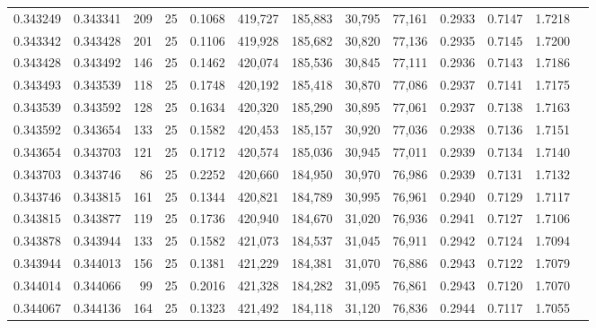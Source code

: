 \begin{tabular}{rrrrrrrrrrrrr}
0.343249 & 0.343341 &   209 &  25 &                                     0.1068 & 419,727 & 185,883 &  30,795 &  77,161 & 0.2933 & 0.7147 & 1.7218 \\
0.343342 & 0.343428 &   201 &  25 &                                     0.1106 & 419,928 & 185,682 &  30,820 &  77,136 & 0.2935 & 0.7145 & 1.7200 \\
0.343428 & 0.343492 &   146 &  25 &                                     0.1462 & 420,074 & 185,536 &  30,845 &  77,111 & 0.2936 & 0.7143 & 1.7186 \\
0.343493 & 0.343539 &   118 &  25 &                                     0.1748 & 420,192 & 185,418 &  30,870 &  77,086 & 0.2937 & 0.7141 & 1.7175 \\
0.343539 & 0.343592 &   128 &  25 &                                     0.1634 & 420,320 & 185,290 &  30,895 &  77,061 & 0.2937 & 0.7138 & 1.7163 \\
0.343592 & 0.343654 &   133 &  25 &                                     0.1582 & 420,453 & 185,157 &  30,920 &  77,036 & 0.2938 & 0.7136 & 1.7151 \\
0.343654 & 0.343703 &   121 &  25 &                                     0.1712 & 420,574 & 185,036 &  30,945 &  77,011 & 0.2939 & 0.7134 & 1.7140 \\
0.343703 & 0.343746 &    86 &  25 &                                     0.2252 & 420,660 & 184,950 &  30,970 &  76,986 & 0.2939 & 0.7131 & 1.7132 \\
0.343746 & 0.343815 &   161 &  25 &                                     0.1344 & 420,821 & 184,789 &  30,995 &  76,961 & 0.2940 & 0.7129 & 1.7117 \\
0.343815 & 0.343877 &   119 &  25 &                                     0.1736 & 420,940 & 184,670 &  31,020 &  76,936 & 0.2941 & 0.7127 & 1.7106 \\
0.343878 & 0.343944 &   133 &  25 &                                     0.1582 & 421,073 & 184,537 &  31,045 &  76,911 & 0.2942 & 0.7124 & 1.7094 \\
0.343944 & 0.344013 &   156 &  25 &                                     0.1381 & 421,229 & 184,381 &  31,070 &  76,886 & 0.2943 & 0.7122 & 1.7079 \\
0.344014 & 0.344066 &    99 &  25 &                                     0.2016 & 421,328 & 184,282 &  31,095 &  76,861 & 0.2943 & 0.7120 & 1.7070 \\
0.344067 & 0.344136 &   164 &  25 &                                     0.1323 & 421,492 & 184,118 &  31,120 &  76,836 & 0.2944 & 0.7117 & 1.7055 \\

\end{tabular}

